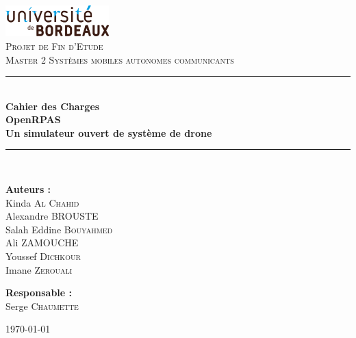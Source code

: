 \documentclass[12pt,a4paper]{article}
\newcommand{\HRule}{\rule{\linewidth}{0.5mm}}
\begin{document}
\begin{titlepage}
\begin{center}

\includegraphics[width=0.3\textwidth]{images/universite_bordeaux_logo.png}\\[1cm]    


\textsc{\Large Projet de Fin d'Etude}\\[0.5cm]
\textsc{\Large Master 2 Systèmes mobiles autonomes communicants}\\[0.5cm]

\vspace{30pt}
\HRule \\[0.4cm]
{ \huge \bfseries Cahier des Charges \\[0.7cm]
OpenRPAS \\[0.5cm]
Un simulateur ouvert
de système de drone}\\[0.4cm]

\HRule \\[1.5cm]

\begin{minipage}{0.4\textwidth}
\begin{flushleft} \large
\textbf{Auteurs :}\\
Kinda \textsc{Al Chahid}\\
Alexandre \textsc{BROUSTE}\\
Salah Eddine  \textsc{Bouyahmed}\\
Ali  \textsc{ZAMOUCHE}\\
Youssef \textsc{Dichkour}\\
Imane \textsc{Zerouali}
\end{flushleft}
\end{minipage}
\begin{minipage}{0.4\textwidth}
\begin{flushright} \large
\textbf{Responsable :} \\
Serge \textsc{Chaumette}\\
\end{flushright}
\end{minipage}

\vfill

{\large \today}

\end{center}

\end{titlepage}
\end{document}
